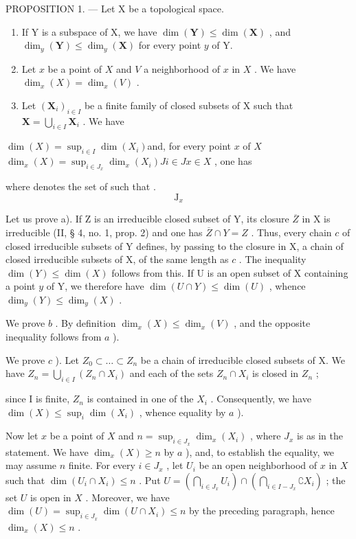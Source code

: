 PROPOSITION 1. --- Let X be a topological space.

\begin{enumerate}
\def\labelenumi{\alph{enumi})}
\item
  If Y is a subspace of X, we have \(\dim(\mathbf{Y}) \leqslant \dim(\mathbf{X})\) , and \(\dim_y(\mathbf{Y}) \leqslant \dim_y(\mathbf{X})\) for every point \(y\) of Y.
\item
  Let \(x\) be a point of \(X\) and \(V\) a neighborhood of \(x\) in \(X\) . We have \(\dim_x(X) = \dim_x(V)\) .
\item
  Let \((\mathbf{X}_i)_{i\in I}\) be a finite family of closed subsets of X such that \(\mathbf{X} = \bigcup_{i\in I}\mathbf{X}_i\) . We have
\end{enumerate}

\(\dim(X) = \sup_{i \in I} \dim(X_i)\)and, for every point \(x\) of \(X\)\(\dim_x(X) = \sup_{i \in J_x} \dim_x(X_i)\)\(J\)\(i \in J\)\(x \in X\) , one has

where  denotes the set of  such that .\[
\mathrm{J} _ {x}
\]

Let us prove a). If Z is an irreducible closed subset of Y, its closure \(\overline{Z}\) in X is irreducible (II, § 4, no. 1, prop. 2) and one has \(\overline{Z} \cap Y = Z\) . Thus, every chain \(c\) of closed irreducible subsets of Y defines, by passing to the closure in X, a chain of closed irreducible subsets of X, of the same length as \(c\) . The inequality \(\dim(Y) \leqslant \dim(X)\) follows from this. If U is an open subset of X containing a point \(y\) of Y, we therefore have \(\dim(U \cap Y) \leqslant \dim(U)\) , whence \(\dim_y(Y) \leqslant \dim_y(X)\) .

We prove \(b\) . By definition \(\dim_{x}(X) \leqslant \dim_{x}(V)\) , and the opposite inequality follows from \(a\) ).

We prove \(c\) ). Let \(Z_{0} \subset \ldots \subset Z_{n}\) be a chain of irreducible closed subsets of X. We have \(Z_{n} = \bigcup_{i \in I} (Z_{n} \cap X_{i})\) and each of the sets \(Z_{n} \cap X_{i}\) is closed in \(Z_{n}\) ;

since I is finite, \(Z_{n}\) is contained in one of the \(X_{i}\) . Consequently, we have \(\dim(X) \leqslant \sup_{i} \dim(X_{i})\) , whence equality by \(a\) ).

Now let \(x\) be a point of \(X\) and \(n = \sup_{i \in J_x} \dim_x(X_i)\) , where \(J_x\) is as in the statement. We have \(\dim_x(X) \geqslant n\) by \(a\) ), and, to establish the equality, we may assume \(n\) finite. For every \(i \in J_x\) , let \(U_i\) be an open neighborhood of \(x\) in \(X\) such that \(\dim(U_i \cap X_i) \leqslant n\) . Put \(U = (\bigcap_{i \in J_x} U_i) \cap (\bigcap_{i \in I - J_x} \complement X_i)\) ; the set \(U\) is open in \(X\) . Moreover, we have \(\dim(U) = \sup_{i \in J_x} \dim(U \cap X_i) \leqslant n\) by the preceding paragraph, hence \(\dim_x(X) \leqslant n\) .

